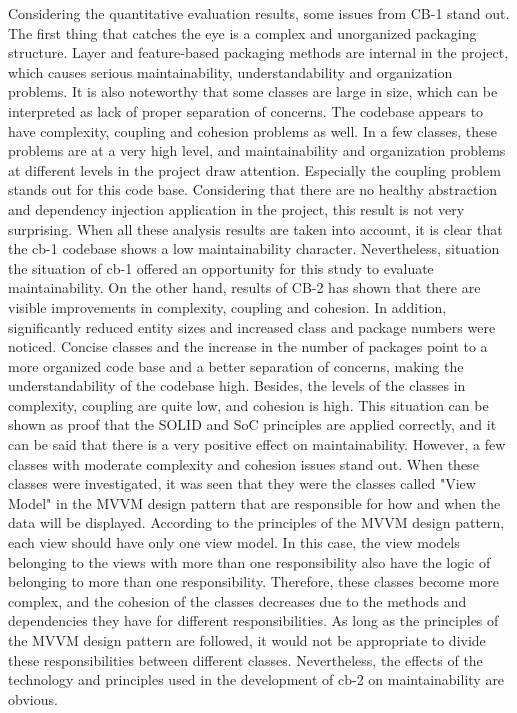 Considering the quantitative evaluation results, some issues from CB-1 stand out. The first thing that catches the eye is a complex and unorganized packaging structure. Layer and feature-based packaging methods are internal in the project, which causes serious maintainability, understandability and organization problems. It is also noteworthy that some classes are large in size, which can be interpreted as lack of proper separation of concerns. The codebase appears to have complexity, coupling and cohesion problems as well. In a few classes, these problems are at a very high level, and maintainability and organization problems at different levels in the project draw attention. Especially the coupling problem stands out for this code base. Considering that there are no healthy abstraction and dependency injection application in the project, this result is not very surprising. When all these analysis results are taken into account, it is clear that the cb-1 codebase shows a low maintainability character. Nevertheless, situation the situation of cb-1 offered an opportunity for this study to evaluate maintainability. On the other hand, results of CB-2 has shown that there are visible improvements in complexity, coupling and cohesion. In addition, significantly reduced entity sizes and increased class and package numbers were noticed. Concise classes and the increase in the number of packages point to a more organized code base and a better separation of concerns, making the understandability of the codebase high. Besides, the levels of the classes in complexity, coupling are quite low, and cohesion is high. This situation can be shown as proof that the SOLID and SoC principles are applied correctly, and it can be said that there is a very positive effect on maintainability. However, a few classes with moderate complexity and cohesion issues stand out. When these classes were investigated, it was seen that they were the classes called "View Model" in the MVVM design pattern that are responsible for how and when the data will be displayed. According to the principles of the MVVM design pattern, each view should have only one view model. In this case, the view models belonging to the views with more than one responsibility also have the logic of belonging to more than one responsibility. Therefore, these classes become more complex, and the cohesion of the classes decreases due to the methods and dependencies they have for different responsibilities. As long as the principles of the MVVM design pattern are followed, it would not be appropriate to divide these responsibilities between different classes. Nevertheless, the effects of the technology and principles used in the development of cb-2 on maintainability are obvious.

